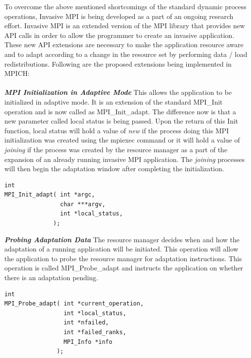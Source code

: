 \noindent
To overcome the above mentioned shortcomings of the standard dynamic process operations, Invasive MPI is being developed as a part of an ongoing research effort. Invasive MPI is an extended version of the MPI library that provides new API calls in order to allow the programmer to create an invasive application. These new API extensions are necessary to make the application resource aware and to adapt according to a change in the resource set by performing data / load redistributions. Following are the proposed extensions being implemented in MPICH:\\ \\
\textbf{\textit{MPI Initialization in Adaptive Mode}} This allows the application to be initialized in adaptive mode. It is an extension of the standard MPI{\_}Init operation and is now called as MPI{\_}Init{\_}adapt. The difference now is that a new parameter called local status is being passed. Upon the return of this Init function, local status will hold a value of \textit{new} if the process doing this MPI initialization was created using the mpiexec command or it will hold a value of \textit{joining} if the process was created by the resource manager as a part of the expansion of an already running invasive MPI application. The \textit{joining} processes will then begin the adaptation window after completing the initialization. 
\begin{lstlisting}[frame=single]
int 
MPI_Init_adapt( int *argc,
                char ***argv,
                int *local_status,
              );
\end{lstlisting}
\textbf{\textit{Probing Adaptation Data}} The resource manager decides when and how the adaptation of a running application will be initiated. This operation will allow the application to probe the resource manager for adaptation instructions. This operation is called MPI{\_}Probe{\_}adapt and instructs the application on whether there is an adaptation pending.  
\begin{lstlisting}[frame=single]
int
MPI_Probe_adapt( int *current_operation,
                 int *local_status,
                 int *nfailed,
                 int *failed_ranks,
                 MPI_Info *info
               );
\end{lstlisting}

